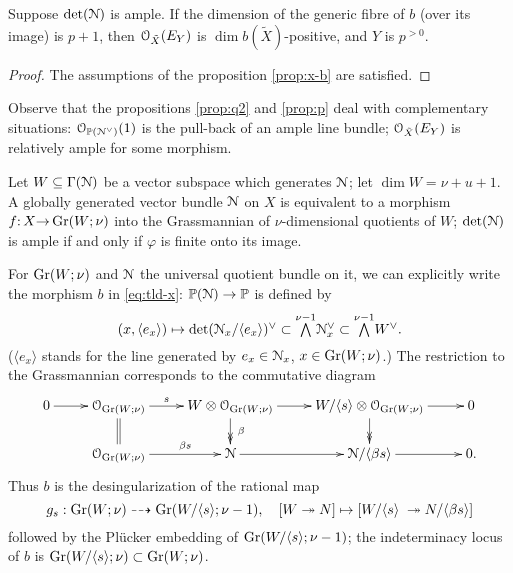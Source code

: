 \documentclass[11pt,reqno]{amsart}
\let\mt\mapsto
\let\euf\EuScript
\let\mbb\mathbb
\let\tld\tilde
\let\vphi\varphi
\let\lan\langle
\let\ran\rangle
\numberwithin{equation}{section}
\numberwithin{figure}{section}
\let\surj\twoheadrightarrow
\begin{document}
\begin{m-proposition}\label{prop:p}
Suppose ${{\rm det}}({{\euf N}})$ is ample. If the dimension of the generic fibre of $b$ 
(over its image) is $p+1$, then ${{\euf O}}_{\tld X}(E_Y)$ is $\dim b(\tld X)$-positive, 
and $Y$ is $p^{{>0}}$. 
\end{m-proposition}

\begin{proof}
The assumptions of the proposition \ref{prop:x-b} are satisfied. 
\end{proof}

Observe that the propositions \ref{prop:q2} and \ref{prop:p} deal with 
complementary situations: ${{\euf O}}_{\mbb P({{\euf N}}^\vee)}(1)$ is the pull-back of 
an ample line bundle; ${{\euf O}}_{\tld X}(E_Y)$ is relatively ample for some morphism.

Let $W\subseteq\Gamma({{\euf N}})$ be a vector subspace which generates ${{\euf N}}$; 
let $\dim W=\nu+u+1$. 
A globally generated vector bundle ${{\euf N}}$ on $X$ is equivalent to a morphism 
$f{:}\,X{\to}\,{{\rm Gr}}(W;\nu)$ into the Grassmannian of $\nu$-dimensional quotients 
of $W$; ${{\rm det}}({{\euf N}})$ is ample if and only if $\vphi$ is finite onto its image. 

For ${{\rm Gr}}(W;\nu)$ and ${{\euf N}}$ the universal quotient bundle on it, we can explicitly 
write the morphism $b$ in \eqref{eq:tld-x}: $\mbb P({{\euf N}})\to\mbb P$ is defined by 
\begin{equation}\label{eq:q}
\mbox{$
(x,{{\lan {e_x}\ran}})\mt 
{{\rm det}}({{\euf N}}_x/{{\lan {e_x}\ran}})^\vee\subset
\overset{\nu-1}{\bigwedge}{{\euf N}}_x^\vee\subset
\overset{\nu-1}{\bigwedge}W^\vee.
$}
\end{equation}
(${{\lan {e_x}\ran}}$ stands for the line generated by $e_x\in{{\euf N}}_x$, $x\in{{\rm Gr}}(W;\nu)$.) 
The restriction to the Grassmannian corresponds to the commutative diagram  
\begin{equation}\label{eq:wn}
\xymatrix@R=1.75em{
0\ar[r]&{{\euf O}}_{{{\rm Gr}}(W;\nu)}\ar[r]^-{s}\ar@{=}[d]&
W\otimes{{\euf O}}_{{{\rm Gr}}(W;\nu)}\ar[r]\ar@{->>}[d]^-{\;\beta}&
W/{{\lan {s}\ran}}\otimes{{\euf O}}_{{{\rm Gr}}(W;\nu)}\ar[r]\ar@{->>}[d]&0
\\ 
&{{\euf O}}_{{{\rm Gr}}(W;\nu)}\ar[r]^-{\beta s}&{{\euf N}}\ar[r]&{{\euf N}}/{{\lan {\beta s}\ran}}\ar[r]&0.
}
\end{equation}
Thus $b$ is the desingularization of the rational map 
\begin{equation}\label{eq:q-grs}
g_s:{{\rm Gr}}(W;\nu)\dashto{{\rm Gr}}(W/{{\lan {s}\ran}};\nu-1),\quad 
[W\surj N]\mt [W/{{\lan {s}\ran}}\;\surj N/{{\lan {\beta s}\ran}}]
\end{equation}
followed by the Pl\"ucker embedding of ${{\rm Gr}}(W/{{\lan {s}\ran}};\nu-1)$; 
the indeterminacy locus of $b$ is ${{\rm Gr}}(W/{{\lan {s}\ran}};\nu)\subset{{\rm Gr}}(W;\nu)$.
\end{document}

